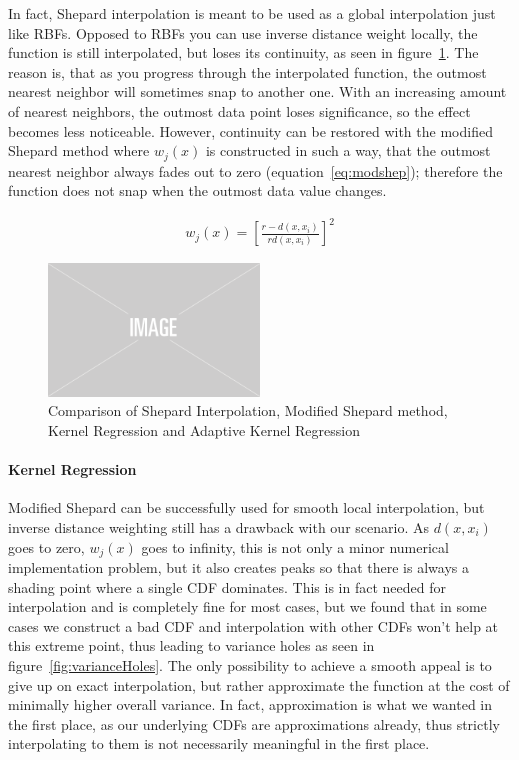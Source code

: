 In fact, Shepard interpolation is meant to be used as a global interpolation just like RBFs. Opposed to RBFs you can use inverse distance weight locally, the function is still interpolated, but loses its continuity, as seen in figure~\ref{fig:shepmodshepkradkreg}. The reason is, that as you progress through the interpolated function, the outmost nearest neighbor will sometimes snap to another one. With an increasing amount of nearest neighbors, the outmost data point loses significance, so the effect becomes less noticeable. However, continuity can be restored with the modified Shepard method \parencite{franke1980smooth, DBLP:conf/siggraph/AnjyoLP14} where $w_j(x)$ is constructed in such a way, that the outmost nearest neighbor always fades out to zero (equation~\ref{eq:modshep}); therefore the function does not snap when the outmost data value changes.

\begin{align}\label{eq:modshep}
w_j(x) = \left[ \frac{ r - d(x, x_i)}{ rd(x, x_i) } \right]^2
\end{align}

\begin{figure}
    \centering
    \includegraphics[width=0.5\textwidth]{figures/img-placeholder.png}
    \caption{Comparison of Shepard Interpolation, Modified Shepard method, Kernel Regression and Adaptive Kernel Regression}
    \label{fig:shepmodshepkradkreg}
\end{figure}


\paragraph{Kernel Regression}

Modified Shepard can be successfully used for smooth local interpolation, but inverse distance weighting still has a drawback with our scenario. As $d(x, x_i)$ goes to zero, $w_j(x)$ goes to infinity, this is not only a minor numerical implementation problem, but it also creates peaks so that there is always a shading point where a single CDF dominates. This is in fact needed for interpolation and is completely fine for most cases, but we found that in some cases we construct a bad CDF and interpolation with other CDFs won't help at this extreme point, thus leading to variance holes as seen in figure~\ref{fig:varianceHoles}. The only possibility to achieve a smooth appeal is to give up on exact interpolation, but rather approximate the function at the cost of minimally higher overall variance. In fact, approximation is what we wanted in the first place, as our underlying CDFs are approximations already, thus strictly interpolating to them is not necessarily meaningful in the first place.

